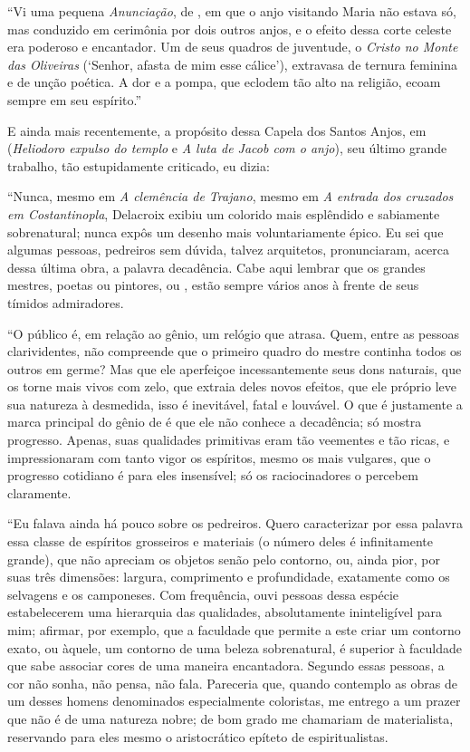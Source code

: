 “Vi uma pequena \textit{Anunciação}, de , em que o anjo
visitando Maria não estava só, mas conduzido em cerimônia por dois
outros anjos, e o efeito dessa corte celeste era poderoso e encantador.
Um de seus quadros de juventude, o \textit{Cristo no Monte das
Oliveiras} (‘Senhor, afasta de mim esse cálice’), extravasa de ternura
feminina e de unção poética. A dor e a pompa, que eclodem tão alto na
religião, ecoam sempre em seu espírito.”

E ainda mais recentemente, a propósito dessa Capela dos Santos Anjos, em
 (\textit{Heliodoro expulso do templo} e \textit{A luta de
Jacob com o anjo}), seu último grande trabalho, tão estupidamente
criticado, eu dizia:

“Nunca, mesmo em \textit{A clemência de Trajano}, mesmo em \textit{A
entrada dos cruzados em Costantinopla}, Delacroix exibiu um colorido
mais esplêndido e sabiamente sobrenatural; nunca expôs um desenho mais
voluntariamente épico. Eu sei que algumas pessoas, pedreiros sem
dúvida, talvez arquitetos, pronunciaram, acerca dessa última obra, a
palavra decadência. Cabe aqui lembrar que os grandes mestres, poetas ou
pintores,  ou , estão sempre vários anos à frente de seus
tímidos admiradores.

“O público é, em relação ao gênio, um relógio que atrasa. Quem, entre as
pessoas clarividentes, não compreende que o primeiro quadro do mestre
continha todos os outros em germe? Mas que ele aperfeiçoe
incessantemente seus dons naturais, que os torne mais vivos com zelo,
que extraia deles novos efeitos, que ele próprio leve sua natureza à
desmedida, isso é inevitável, fatal e louvável. O que é justamente a
marca principal do gênio de  é que ele não conhece a
decadência; só mostra progresso. Apenas, suas qualidades primitivas
eram tão veementes e tão ricas, e impressionaram com tanto vigor os
espíritos, mesmo os mais vulgares, que o progresso cotidiano é para
eles insensível; só os raciocinadores o percebem claramente.

“Eu falava ainda há pouco sobre os pedreiros. Quero caracterizar por
essa palavra essa classe de espíritos grosseiros e materiais (o número
deles é infinitamente grande), que não apreciam os objetos senão pelo
contorno, ou, ainda pior, por suas três dimensões: largura, comprimento
e profundidade, exatamente como os selvagens e os camponeses. Com
frequência, ouvi pessoas dessa espécie estabelecerem uma hierarquia das
qualidades, absolutamente ininteligível para mim; afirmar, por exemplo,
que a faculdade que permite a este criar um contorno exato, ou àquele,
um contorno de uma beleza sobrenatural, é superior à faculdade que sabe
associar cores de uma maneira encantadora. Segundo essas pessoas, a cor
não sonha, não pensa, não fala. Pareceria que, quando contemplo as
obras de um desses homens denominados especialmente coloristas, me
entrego a um prazer que não é de uma natureza nobre; de bom grado me
chamariam de materialista, reservando para eles mesmo o aristocrático
epíteto de espiritualistas.

